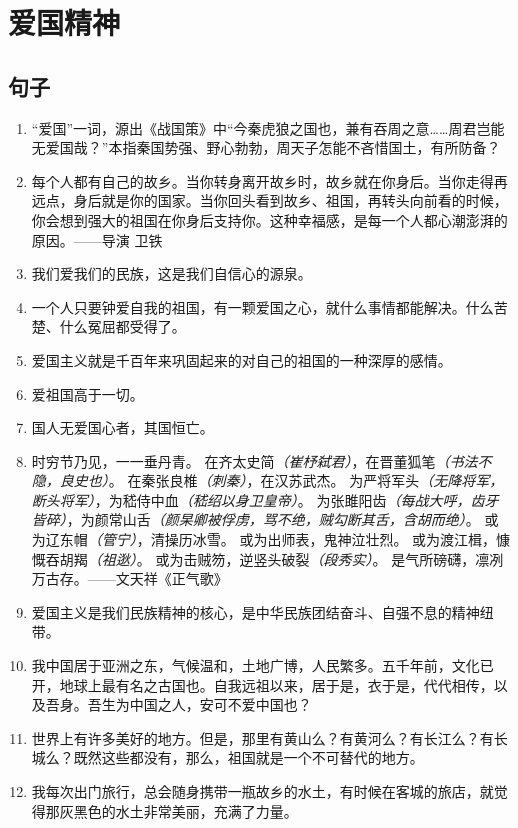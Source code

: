 \section{爱国精神}

\subsection{句子}
\begin{enumerate}
\item “爱国”一词，源出《战国策》中“今秦虎狼之国也，兼有吞周之意……周君岂能无爱国哉？”本指秦国势强、野心勃勃，周天子怎能不吝惜国土，有所防备？
\item 每个人都有自己的故乡。当你转身离开故乡时，故乡就在你身后。当你走得再远点，身后就是你的国家。当你回头看到故乡、祖国，再转头向前看的时候，你会想到强大的祖国在你身后支持你。这种幸福感，是每一个人都心潮澎湃的原因。\hfill ——导演{ }卫铁
\item 我们爱我们的民族，这是我们自信心的源泉。
\item 一个人只要钟爱自我的祖国，有一颗爱国之心，就什么事情都能解决。什么苦楚、什么冤屈都受得了。
\item 爱国主义就是千百年来巩固起来的对自己的祖国的一种深厚的感情。
\item 爱祖国高于一切。
\item 国人无爱国心者，其国恒亡。
\item
时穷节乃见，一一垂丹青。
在齐太史简\textit{（崔杼弑君）}，在晋董狐笔\textit{（书法不隐，良史也）}。
在秦张良椎\textit{（刺秦）}，在汉苏武杰。
为严将军头\textit{（无降将军，断头将军）}，为嵇侍中血\textit{（嵇绍以身卫皇帝）}。
为张雎阳齿\textit{（每战大呼，齿牙皆碎）}，为颜常山舌\textit{（颜杲卿被俘虏，骂不绝，贼勾断其舌，含胡而绝）}。
或为辽东帽\textit{（管宁）}，清操历冰雪。
或为出师表，鬼神泣壮烈。
或为渡江楫，慷慨吞胡羯\textit{（祖逖）}。
或为击贼笏，逆竖头破裂\textit{（段秀实）}。
是气所磅礴，凛冽万古存。\hfill ——文天祥《正气歌》
\item 爱国主义是我们民族精神的核心，是中华民族团结奋斗、自强不息的精神纽带。
\item 我中国居于亚洲之东，气候温和，土地广博，人民繁多。五千年前，文化已开，地球上最有名之古国也。自我远祖以来，居于是，衣于是，代代相传，以及吾身。吾生为中国之人，安可不爱中国也？
\item 世界上有许多美好的地方。但是，那里有黄山么？有黄河么？有长江么？有长城么？既然这些都没有，那么，祖国就是一个不可替代的地方。
\item 我每次出门旅行，总会随身携带一瓶故乡的水土，有时候在客城的旅店，就觉得那灰黑色的水土非常美丽，充满了力量。

\end{enumerate}

